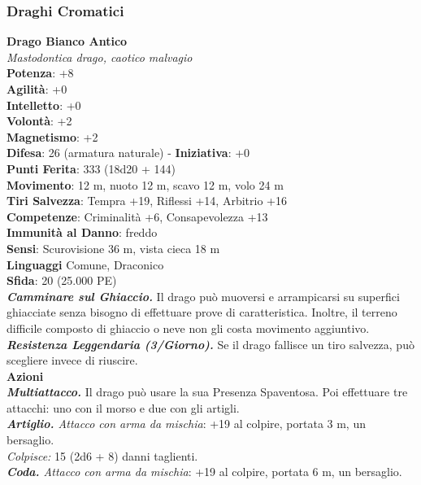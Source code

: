 \begin{multicols}{2}
\subsubsection{Draghi Cromatici}

\medskip\textbf{Drago Bianco Antico}\\
\emph{Mastodontica drago, caotico malvagio}\\
\textbf{Potenza}: +8\\
\textbf{Agilità}: +0\\
\textbf{Intelletto}: +0\\
\textbf{Volontà}: +2\\
\textbf{Magnetismo}: +2\\
\textbf{Difesa}: 26 (armatura naturale) - \textbf{Iniziativa}: +0\\
\textbf{Punti Ferita}: 333 (18d20 + 144)\\
\textbf{Movimento}: 12 m, nuoto 12 m, scavo 12 m, volo 24 m\\
\textbf{Tiri Salvezza}: Tempra +19, Riflessi +14, Arbitrio +16\\
\textbf{Competenze}: Criminalità +6, Consapevolezza +13\\
\textbf{Immunità al Danno}: freddo\\
\textbf{Sensi}: Scurovisione 36 m, vista cieca 18 m\\
\textbf{Linguaggi} Comune, Draconico\\
\textbf{Sfida}: 20 (25.000 PE)\smallskip\\
\emph{\textbf{Camminare sul Ghiaccio.}} Il drago può muoversi e arrampicarsi su superfici ghiacciate senza bisogno di effettuare prove di caratteristica. Inoltre, il terreno difficile composto di ghiaccio o neve non gli costa movimento aggiuntivo.\\
\emph{\textbf{Resistenza Leggendaria (3/Giorno).}} Se il drago fallisce un tiro salvezza, può scegliere invece di riuscire.\\
\smallskip\textbf{Azioni}\\
\emph{\textbf{Multiattacco.}} Il drago può usare la sua Presenza Spaventosa. Poi effettuare tre attacchi: uno con il morso e due con gli artigli.\\
\emph{\textbf{Artiglio.} Attacco con arma da mischia}: +19 al colpire, portata 3 m, un bersaglio.\\
\emph{Colpisce:} 15 (2d6 + 8) danni taglienti.\\
\emph{\textbf{Coda.} Attacco con arma da mischia}: +19 al colpire, portata 6 m, un bersaglio.\\

\end{multicols}
